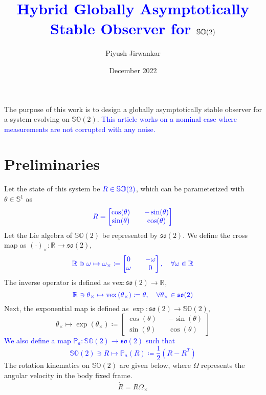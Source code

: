 \documentclass{article}
\title{\textcolor{blue}{Hybrid Globally Asymptotically Stable Observer for $\SOtwo$}}
\author{Piyush Jirwankar}
\date{December 2022}
\newcommand{\SOtwo}{\mathbb{SO}(2)}
\newcommand{\sotwo}{\mathfrak{so}(2)}
\newcommand{\R}[1]{\mathbb{R}^{#1}}
\newcommand{\dotR}{\dot{R}}
\newcommand{\Omegay}{\Omega^y}
\newcommand{\vex}[1]{\text{vex}\left(#1\right)}
\newtheorem{assumption}{Assumption}
\newcommand{\brackets}[1]{\left(#1\right)}
\newcommand{\textblue}[1]{\textcolor{blue}{#1}}
\begin{document}
\maketitle

The purpose of this work is to design a globally asymptotically stable observer for a system evolving on $\SOtwo$. \textblue{This article works on a nominal case where measurements are not corrupted with any noise.}

\section{Preliminaries}

Let the state of this system be $\textcolor{blue}{R\in\SOtwo}$, which can be parameterized with $\theta\in\mathbb{S}^1$ as \[\textcolor{blue}{R = \begin{bmatrix}
    \cos(\theta) && -\sin(\theta)\\
    \sin(\theta) && \cos(\theta)
\end{bmatrix}}\]
Let the Lie algebra of $\SOtwo$ be represented by $\sotwo$. We define the cross map as $(\cdot)_\times : \R{} \to \sotwo$, \[\textcolor{blue}{ \R{} \ni\omega\mapsto \omega_\times \coloneqq \begin{bmatrix} 0 && -\omega \\ \omega && 0\end{bmatrix}, \quad \forall \omega\in\R{}}\]
The inverse operator is defined as $\text{vex}: \sotwo \to \R{}$,\[\textcolor{blue}{\R{}\ni\theta_\times\mapsto \vex{\theta_\times}\coloneqq \theta, \quad \forall \theta_\times \in \sotwo}\]
Next, the exponential map is defined as $\exp: \sotwo \to \SOtwo$, \[ \theta_\times \mapsto \exp\left(\theta_\times \right)\coloneqq \begin{bmatrix}
    \cos(\theta) && -\sin(\theta)\\
    \sin(\theta) && \cos(\theta)
\end{bmatrix}\]
\textblue{We also define a map $\mathbb{P}_a : \SOtwo \to \sotwo$ such that \[\SOtwo\ni R \mapsto \mathbb{P}_a(R) \coloneqq \frac{1}{2}\brackets{R - R^T}\]}
The rotation kinematics on $\SOtwo$ are given below, where $\Omega$ represents the angular velocity in the body fixed frame. 
\begin{align}\label{eq:rotationKinematics}
    \dotR = R\Omega_\times
\end{align}
\end{document}
